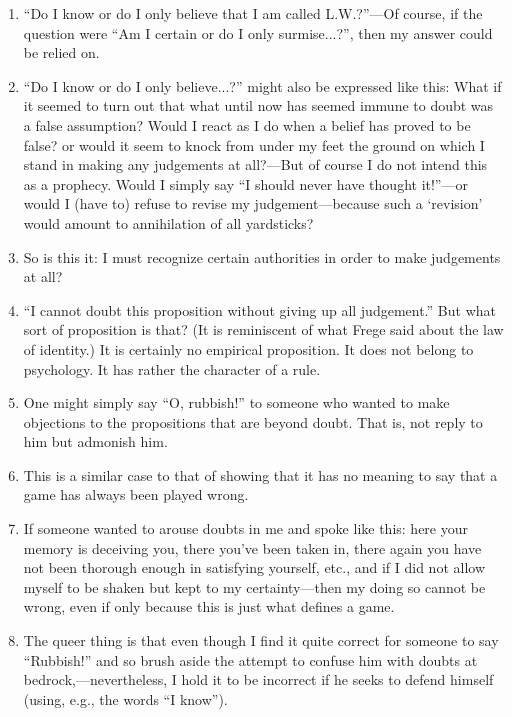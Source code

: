 \documentclass{book}
\begin{document}
\begin{enumerate}
\item
``Do I know or do I only believe that I am called L.W.?''---Of course, if the
question were ``Am I certain or do I only surmise...?'', then my answer could
be relied on.

\item
``Do I know or do I only believe...?'' might also be expressed like this: What
if it seemed to turn out that what until now has seemed immune to doubt was a
false assumption? Would I react as I do when a belief has proved to be false?
or would it seem to knock from under my feet the ground on which I stand in
making any judgements at all?---But of course I do not intend this as a
prophecy.  Would I simply say ``I should never have thought it!''---or would I
(have to) refuse to revise my judgement---because such a `revision' would
amount to annihilation of all yardsticks?

\item
So is this it: I must recognize certain authorities in order to make judgements
at all?

\item
``I cannot doubt this proposition without giving up all judgement.'' But what
sort of proposition is that? (It is reminiscent of what Frege said about the
law of identity.) It is certainly no empirical proposition. It does not belong
to psychology. It has rather the character of a rule.

\item
One might simply say ``O, rubbish!'' to someone who wanted to make objections
to the propositions that are beyond doubt. That is, not reply to him but
admonish him.

\item
This is a similar case to that of showing that it has no meaning to say that a
game has always been played wrong.

\item
If someone wanted to arouse doubts in me and spoke like this: here your memory
is deceiving you, there you've been taken in, there again you have not been
thorough enough in satisfying yourself, etc., and if I did not allow myself to
be shaken but kept to my certainty---then my doing so cannot be wrong, even if
only because this is just what defines a game.

\item
The queer thing is that even though I find it quite correct for someone to say
``Rubbish!'' and so brush aside the attempt to confuse him with doubts at
bedrock,---nevertheless, I hold it to be incorrect if he seeks to defend
himself (using, e.g., the words ``I know'').


\end{enumerate}
\end{document}
